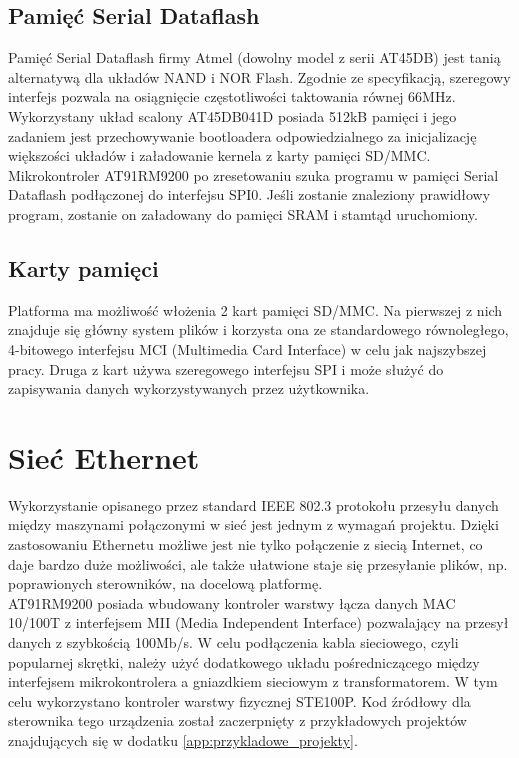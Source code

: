 \documentclass[a4paper,12pt]{book}
\begin{document}
			\subsection{Pamięć Serial Dataflash}
				Pamięć Serial Dataflash firmy Atmel (dowolny model z serii AT45DB) jest tanią alternatywą dla układów NAND i NOR Flash. Zgodnie ze specyfikacją, szeregowy interfejs pozwala na osiągnięcie częstotliwości taktowania równej 66MHz.\\
				Wykorzystany układ scalony AT45DB041D posiada 512kB pamięci i jego zadaniem jest przechowywanie bootloadera odpowiedzialnego za inicjalizację większości układów i załadowanie kernela z karty pamięci SD/MMC.\\
				Mikrokontroler AT91RM9200 po zresetowaniu szuka programu w pamięci Serial Dataflash podłączonej do interfejsu SPI0. Jeśli zostanie znaleziony prawidłowy program, zostanie on załadowany do pamięci SRAM i stamtąd uruchomiony.
			\subsection{Karty pamięci}
				Platforma ma możliwość włożenia 2 kart pamięci SD/MMC. Na pierwszej z nich znajduje się główny system plików i korzysta ona ze standardowego równoległego, 4-bitowego interfejsu MCI (Multimedia Card Interface) w celu jak najszybszej pracy. Druga z kart używa szeregowego interfejsu SPI i może służyć do zapisywania danych wykorzystywanych przez użytkownika.
		\section{Sieć Ethernet}
			Wykorzystanie opisanego przez standard IEEE 802.3 protokołu przesyłu danych między maszynami połączonymi w sieć jest jednym z wymagań projektu. Dzięki zastosowaniu Ethernetu możliwe jest nie tylko połączenie z siecią Internet, co daje bardzo duże możliwości, ale także ułatwione staje się przesyłanie plików, np. poprawionych sterowników, na docelową platformę.\\
			AT91RM9200 posiada wbudowany kontroler warstwy łącza danych MAC 10/100T z interfejsem MII (Media Independent Interface) pozwalający na przesył danych z szybkością 100Mb/s. W celu podłączenia kabla sieciowego, czyli popularnej skrętki, należy użyć dodatkowego układu pośredniczącego między interfejsem mikrokontrolera a gniazdkiem sieciowym z transformatorem. W tym celu wykorzystano kontroler warstwy fizycznej STE100P. Kod źródłowy dla sterownika tego urządzenia został zaczerpnięty z przykładowych projektów znajdujących się w dodatku \ref{app:przykladowe_projekty}.
\end{document}
